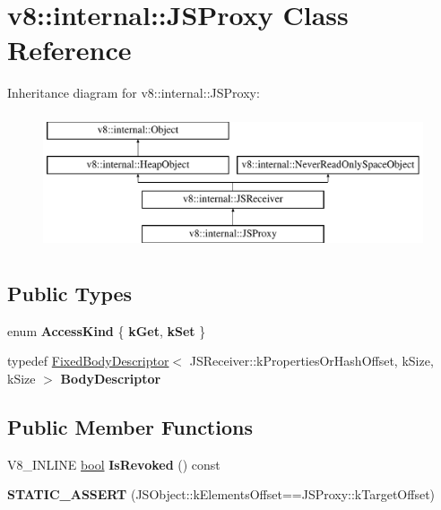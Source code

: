 \hypertarget{classv8_1_1internal_1_1JSProxy}{}\section{v8\+:\+:internal\+:\+:J\+S\+Proxy Class Reference}
\label{classv8_1_1internal_1_1JSProxy}
Inheritance diagram for v8\+:\+:internal\+:\+:J\+S\+Proxy\+:\begin{figure}[H]
\begin{center}
\leavevmode
\includegraphics[height=4.000000cm]{classv8_1_1internal_1_1JSProxy}
\end{center}
\end{figure}
\subsection*{Public Types}
\begin{DoxyCompactItemize}
\item 
\mbox{\label{classv8_1_1internal_1_1JSProxy_a3e09cea9c55dd500ebc6a9271089fa91}} 
enum {\bfseries Access\+Kind} \{ {\bfseries k\+Get}, 
{\bfseries k\+Set}
 \}
\item 
\mbox{\label{classv8_1_1internal_1_1JSProxy_affbff31552dcb43f40664805450115f5}} 
typedef \mbox{\hyperlink{classv8_1_1internal_1_1FixedBodyDescriptor}{Fixed\+Body\+Descriptor}}$<$ J\+S\+Receiver\+::k\+Properties\+Or\+Hash\+Offset, k\+Size, k\+Size $>$ {\bfseries Body\+Descriptor}
\end{DoxyCompactItemize}
\subsection*{Public Member Functions}
\begin{DoxyCompactItemize}
\item 
\mbox{\label{classv8_1_1internal_1_1JSProxy_aec6628ce4ca38b643410fd2446414637}} 
V8\+\_\+\+I\+N\+L\+I\+NE \mbox{\hyperlink{classbool}{bool}} {\bfseries Is\+Revoked} () const
\item 
\mbox{\label{classv8_1_1internal_1_1JSProxy_a684587ff87bbd45e34a20df3a9ec29d6}} 
{\bfseries S\+T\+A\+T\+I\+C\+\_\+\+A\+S\+S\+E\+RT} (J\+S\+Object\+::k\+Elements\+Offset==J\+S\+Proxy\+::k\+Target\+Offset)
\end{DoxyCompactItemize}
